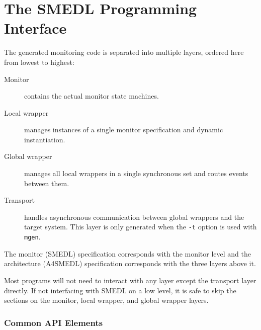 \documentclass[paper=letter,titlepage,captions=tableheading]{scrartcl}
\begin{document}



\clearpage
\part{The SMEDL Programming Interface}
\label{part:api}

The generated monitoring code is separated into multiple layers, ordered here
from lowest to highest:
\begin{description}
  \item[Monitor] contains the actual monitor state machines.
  \item[Local wrapper] manages instances of a single monitor specification and
    dynamic instantiation.
  \item[Global wrapper] manages all local wrappers in a single synchronous set
    and routes events between them.
  \item[Transport] handles asynchronous communication between global wrappers
    and the target system. This layer is only generated when the \texttt{-t}
    option is used with \texttt{mgen}.
\end{description}

The monitor (SMEDL) specification corresponds with the monitor level and the
architecture (A4SMEDL) specification corresponds with the three layers above
it.

\begin{shaded}
  Most programs will not need to interact with any layer except the transport
  layer directly. If not interfacing with SMEDL on a low level, it is safe to
  skip the sections on the monitor, local wrapper, and global wrapper layers.
\end{shaded}

\section{Common API Elements}
\label{sec:common}
\end{document}
